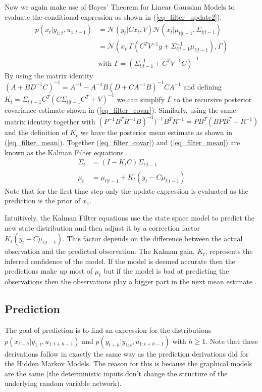 \documentclass[../masters.tex]{subfiles}
\begin{document}
Now we again make use of Bayes' Theorem for Linear Gaussian Models to evaluate the conditional expression as shown in (\ref{eq_filter_update2}).
\begin{equation}
\begin{aligned}
p(x_t|y_{1:t},u_{1:t-1}) &=\mathcal{N}(y_{t}|Cx_{t}, V)\mathcal{N}(x_t|\mu_{t|t-1},\Sigma_{t|t-1})\\ 
&= \mathcal{N}(x_t|\Gamma(C^TV^{-1}y + \Sigma_{t|t-1}^{-1}\mu_{t|t-1}), \Gamma) \\
&\text{with } \Gamma = (\Sigma_{t|t-1}^{-1}+C^TV^{-1}C)^{-1} 
\end{aligned}
\label{eq_filter_update2}
\end{equation} 
By using the matrix identity $(A+BD^{-1}C)^{-1}=A^{-1}-A^{-1}B(D+CA^{-1}B)^{-1}CA^{-1}$ and defining $K_t = \Sigma_{t|t-1}C^T(C\Sigma_{t|t-1}C^T+V)^{-1}$ we can simplify $\Gamma$ to the recursive posterior covariance estimate shown in (\ref{eq_filter_covar}). Similarly, using the same matrix identity together with $(P^{-1} B^TR^{-1}B)^{-1})^{-1}B^TR^{-1} = PB^T(BPB^T+R^{-1})$ and the definition of $K_t$ we have the posterior mean estimate as shown in (\ref{eq_filter_mean}). Together (\ref{eq_filter_covar}) and (\ref{eq_filter_mean}) are known as the Kalman Filter equations \cite{murphy2}.
\begin{align}
\Sigma_t &= (I-K_tC)\Sigma_{t|t-1} 
\label{eq_filter_covar} \\
\mu_t &= \mu_{t|t-1} + K_t(y_t - C\mu_{t|t-1})
\label{eq_filter_mean}
\end{align}
Note that for the first time step only the update expression is evaluated as the prediction is the prior of $x_1$. 

Intuitively, the Kalman Filter equations use the state space model to predict the new state distribution and then adjust it by a correction factor $K_t(y_t - C\mu_{t|t-1})$. This factor depends on the difference between the actual observation and the predicted observation. The Kalman gain, $K_t$, represents the inferred confidence of the model. If the model is deemed accurate then the predictions make up most of $\mu_t$ but if the model is bad at predicting the observations then the observations play a bigger part in the next mean estimate \cite{bishop}. 

\subsection{Prediction}
\label{sec_lin_prediction}
The goal of prediction is to find an expression for the distributions $p(x_{t+h}|y_{1:t}, u_{1:t+h-1})$ and $p(y_{t+h}|y_{1:t}, u_{1:t+h-1})$ with $h\geq 1$. Note that these derivations follow in exactly the same way as the prediction derivations did for the Hidden Markov Models. The reason for this is because the graphical models are the same (the deterministic inputs don't change the structure of the underlying random variable network). 
\end{document}
